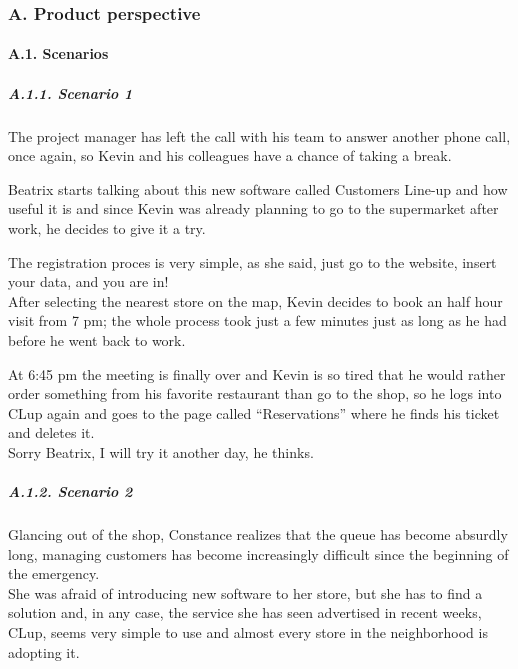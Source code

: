 \documentclass[
]{article}
\begin{document}
\hypertarget{a.-product-perspective}{%
\subsubsection{A. Product perspective}\label{a.-product-perspective}}

\hypertarget{a.1.-scenarios}{%
\paragraph{A.1. Scenarios}\label{a.1.-scenarios}}

\hypertarget{a.1.1.-scenario-1}{%
\subparagraph{\texorpdfstring{A.1.1. Scenario 1
}{A.1.1. Scenario 1 }}\label{a.1.1.-scenario-1}}

The project manager has left the call with his team to answer another
phone call, once again, so Kevin and his colleagues have a chance of
taking a break.

Beatrix starts talking about this new software called Customers Line-up
and how useful it is and since Kevin was already planning to go to the
supermarket after work, he decides to give it a try.

The registration proces is very simple, as she said, just go to the
website, insert your data, and you are in!\\
After selecting the nearest store on the map, Kevin decides to book an
half hour visit from 7 pm; the whole process took just a few minutes
just as long as he had before he went back to work.

At 6:45 pm the meeting is finally over and Kevin is so tired that he
would rather order something from his favorite restaurant than go to the
shop, so he logs into CLup again and goes to the page called
``Reservations'' where he finds his ticket and deletes it.\\
Sorry Beatrix, I will try it another day, he thinks.

\hypertarget{a.1.2.-scenario-2}{%
\subparagraph{\texorpdfstring{A.1.2. Scenario 2
}{A.1.2. Scenario 2 }}\label{a.1.2.-scenario-2}}

Glancing out of the shop, Constance realizes that the queue has become
absurdly long, managing customers has become increasingly difficult
since the beginning of the emergency.\\
She was afraid of introducing new software to her store, but she has to
find a solution and, in any case, the service she has seen advertised in
recent weeks, CLup, seems very simple to use and almost every store in
the neighborhood is adopting it.
\end{document}
